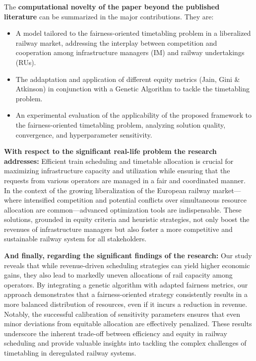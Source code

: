 \documentclass[12pt]{UCLMletter}
\begin{document}
\begin{letter}
The \textbf{computational novelty of the paper beyond the published literature} can be summarized in the major contributions. They are:
\begin{itemize}
    \item A model tailored to the fairness-oriented timetabling problem in a liberalized railway market, addressing the interplay between competition and cooperation among infrastructure managers (IM) and railway undertakings (RUs).
    \item The addaptation and application of different equity metrics (Jain, Gini \& Atkinson) in conjunction with a Genetic Algorithm to tackle the timetabling problem.
    \item An experimental evaluation of the applicability of the proposed framework to the fairness-oriented timetabling problem, analyzing solution quality, convergence, and hyperparameter sensitivity.
\end{itemize}

\textbf{With respect to the significant real-life problem the research addresses:} Efficient train scheduling and timetable allocation is crucial for maximizing infrastructure capacity and utilization while ensuring that the requests from various operators are managed in a fair and coordinated manner. In the context of the growing liberalization of the European railway market—where intensified competition and potential conflicts over simultaneous resource allocation are common—advanced optimization tools are indispensable. These solutions, grounded in equity criteria and heuristic strategies, not only boost the revenues of infrastructure managers but also foster a more competitive and sustainable railway system for all stakeholders.

\textbf{And finally, regarding the significant findings of the research:} Our study reveals that while revenue-driven scheduling strategies can yield higher economic gains, they also lead to markedly uneven allocations of rail capacity among operators. By integrating a genetic algorithm with adapted fairness metrics, our approach demonstrates that a fairness-oriented strategy consistently results in a more balanced distribution of resources, even if it incurs a reduction in revenue. Notably, the successful calibration of sensitivity parameters ensures that even minor deviations from equitable allocation are effectively penalized. These results underscore the inherent trade-off between efficiency and equity in railway scheduling and provide valuable insights into tackling the complex challenges of timetabling in deregulated railway systems.


\end{letter}
\end{document}
